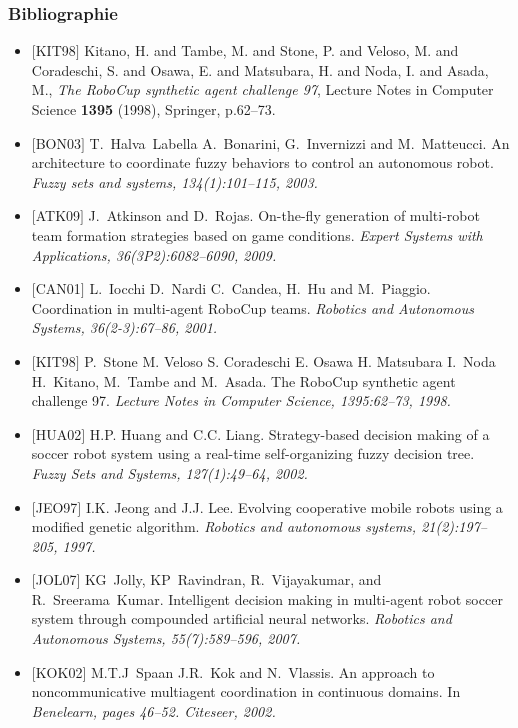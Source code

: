 \documentclass{beamer}
\begin{document}
\begin{frame}[allowframebreaks]
\frametitle{Bibliographie}
\begin{itemize}
    \item $[$KIT98$]$
    Kitano, H. and Tambe, M. and Stone, P. and Veloso, M. and Coradeschi, S. and Osawa, E. and Matsubara, H. and Noda, I. and Asada, M.,
    \emph{{The RoboCup synthetic agent challenge 97}}, Lecture Notes in Computer Science \textbf{1395} (1998), Springer, p.62--73.

	\item $[$BON03$]$
	T.~Halva~Labella A.~Bonarini, G.~Invernizzi and M.~Matteucci.
	 An architecture to coordinate fuzzy behaviors to control an
	  autonomous robot.
	 \em Fuzzy sets and systems, 134(1):101--115, 2003.

	\item $[$ATK09$]$
	J.~Atkinson and D.~Rojas.
	 On-the-fly generation of multi-robot team formation strategies based
	  on game conditions.
	 \em Expert Systems with Applications, 36(3P2):6082--6090, 2009.

	\item $[$CAN01$]$
	L.~Iocchi D.~Nardi C.~Candea, H.~Hu and M.~Piaggio.
	 Coordination in multi-agent RoboCup teams.
	 \em Robotics and Autonomous Systems, 36(2-3):67--86, 2001.

	\item $[$KIT98$]$
	P.~Stone M. Veloso S. Coradeschi E. Osawa H. Matsubara I.~Noda H.~Kitano,
	  M.~Tambe and M.~Asada.
	 The RoboCup synthetic agent challenge 97.
	 \em Lecture Notes in Computer Science, 1395:62--73, 1998.

	\item $[$HUA02$]$
	H.P. Huang and C.C. Liang.
	 Strategy-based decision making of a soccer robot system using a
	  real-time self-organizing fuzzy decision tree.
	 \em Fuzzy Sets and Systems, 127(1):49--64, 2002.

	\item $[$JEO97$]$
	I.K. Jeong and J.J. Lee.
	 Evolving cooperative mobile robots using a modified genetic
	  algorithm.
	 \em Robotics and autonomous systems, 21(2):197--205, 1997.

	\item $[$JOL07$]$
	KG~Jolly, KP~Ravindran, R.~Vijayakumar, and R.~Sreerama~Kumar.
	 Intelligent decision making in multi-agent robot soccer system
	  through compounded artificial neural networks.
	 \em Robotics and Autonomous Systems, 55(7):589--596, 2007.

	\item $[$KOK02$]$
	M.T.J~Spaan J.R.~Kok and N.~Vlassis.
	 An approach to noncommunicative multiagent coordination in
	  continuous domains.
	 In \em Benelearn, pages 46--52. Citeseer, 2002.


\end{itemize}
\end{frame}
\end{document}
